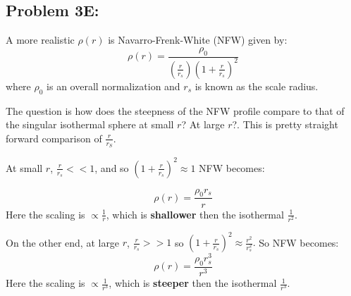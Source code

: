 \subsection*{Problem 3E:}

A more realistic $\rho(r)$ is Navarro-Frenk-White (NFW) given by:
\begin{equation} \label{eq:NFW}
    \rho(r) = \frac{\rho_0}{(\frac{r}{r_s})(1 + \frac{r}{r_s})^2}
\end{equation}
where $\rho_0$ is an overall normalization and $r_s$ is known as the scale radius.

The question is how does the steepness of the NFW profile compare to that of the singular isothermal sphere at small
$r$? At large $r$?. This is pretty straight forward comparison of $\frac{r}{r_S}$. 

At small $r$, $\frac{r}{r_s} <<1$, and so $(1 + \frac{r}{r_s})^2 \approx 1$ NFW becomes:

\begin{equation}
     \rho(r) = \frac{\rho_0r_s}{r}
\end{equation}
Here the scaling is $\propto \frac{1}{r}$, which is \textbf{shallower} then the isothermal $\frac{1}{r^2}$. 

On the other end, at large $r$, $\frac{r}{r_s} >> 1$ so $(1 + \frac{r}{r_s})^2 \approx \frac{r^2}{r_s^2}.$  So NFW becomes: 
\begin{equation}
     \rho(r) = \frac{\rho_0r_s^3}{r^3}
\end{equation}
Here the scaling is $\propto \frac{1}{r^3}$, which is \textbf{steeper} then the isothermal $\frac{1}{r^3}$. 





